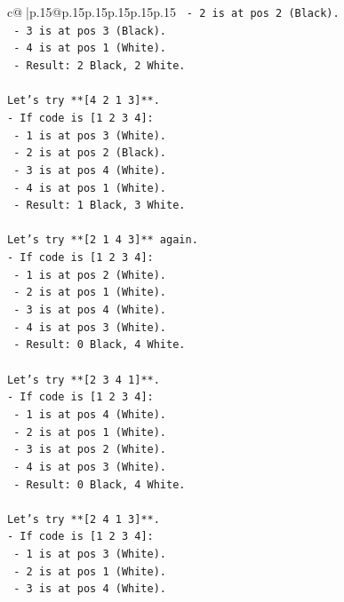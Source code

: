 \documentclass{article}
\begin{document}
{\begin{supertabular}{c@{$\;$}|p{.15\linewidth}@{}p{.15\linewidth}p{.15\linewidth}p{.15\linewidth}p{.15\linewidth}p{.15\linewidth}}
{{{\texttt{  {-} 2 is at pos 2 (Black).} \\
\texttt{  {-} 3 is at pos 3 (Black).} \\
\texttt{  {-} 4 is at pos 1 (White).} \\
\texttt{  {-} Result: 2 Black, 2 White.} \\
\\ 
\texttt{Let's try **{[}4 2 1 3{]}**.} \\
\texttt{{-} If code is {[}1 2 3 4{]}:} \\
\texttt{  {-} 1 is at pos 3 (White).} \\
\texttt{  {-} 2 is at pos 2 (Black).} \\
\texttt{  {-} 3 is at pos 4 (White).} \\
\texttt{  {-} 4 is at pos 1 (White).} \\
\texttt{  {-} Result: 1 Black, 3 White.} \\
\\ 
\texttt{Let's try **{[}2 1 4 3{]}** again.} \\
\texttt{{-} If code is {[}1 2 3 4{]}:} \\
\texttt{  {-} 1 is at pos 2 (White).} \\
\texttt{  {-} 2 is at pos 1 (White).} \\
\texttt{  {-} 3 is at pos 4 (White).} \\
\texttt{  {-} 4 is at pos 3 (White).} \\
\texttt{  {-} Result: 0 Black, 4 White.} \\
\\ 
\texttt{Let's try **{[}2 3 4 1{]}**.} \\
\texttt{{-} If code is {[}1 2 3 4{]}:} \\
\texttt{  {-} 1 is at pos 4 (White).} \\
\texttt{  {-} 2 is at pos 1 (White).} \\
\texttt{  {-} 3 is at pos 2 (White).} \\
\texttt{  {-} 4 is at pos 3 (White).} \\
\texttt{  {-} Result: 0 Black, 4 White.} \\
\\ 
\texttt{Let's try **{[}2 4 1 3{]}**.} \\
\texttt{{-} If code is {[}1 2 3 4{]}:} \\
\texttt{  {-} 1 is at pos 3 (White).} \\
\texttt{  {-} 2 is at pos 1 (White).} \\
\texttt{  {-} 3 is at pos 4 (White).} \\
}}}
\end{supertabular}}
\end{document}
